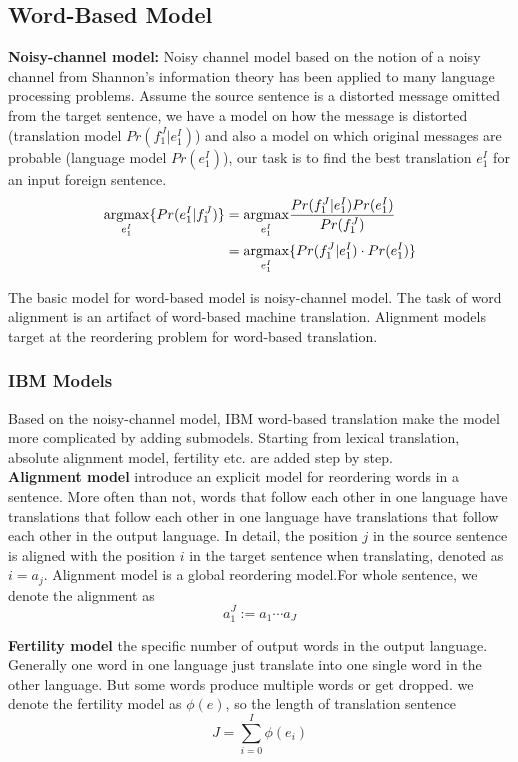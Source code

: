 \subsection{Word-Based Model}
\noindent \textbf{Noisy-channel model:}
Noisy channel model based on the notion of a noisy channel from Shannon's information theory has been applied to many language processing problems. Assume the source sentence is a distorted message omitted from the target sentence, we have a model on  how the message is distorted (translation model $Pr(f_1^J|e_1^I)$) and also a model on which original messages are probable (language model ${Pr(e_1^I)}$), our task is to find the best translation ${e_1^I}$ for an input foreign sentence.
\begin{align*}
\underset{e_1^I}{\operatorname{argmax}} \{Pr(e_1^I | f_1^J)\} & = \underset{e_1^I}{\operatorname{argmax}} {\frac{Pr(f_1^J | e_1^I)Pr(e_1^I)}{Pr(f_1^J)}} \\
& = \underset{e_1^I}{\operatorname{argmax}} { \{ Pr(f_1^J | e_1^I) \cdot  Pr(e_1^I)\} }
\end{align*} 


The basic model for word-based model is noisy-channel model. The task of word alignment is an artifact of word-based machine translation. Alignment models target at the reordering problem for word-based translation.\\

\subsubsection{IBM Models}
Based on the noisy-channel model, IBM word-based translation make the model more complicated by adding submodels. Starting from lexical translation, absolute alignment model, fertility etc. are added step by step.\\

 \textbf{Alignment model} introduce an explicit model for reordering words in a sentence. More often than not, words that follow each other in one language have translations that follow each other in one language have translations that follow each other in the output language. In detail, the position $j$ in the source sentence is aligned with the position $i$ in the target sentence when translating, denoted as  ${i=a_j}$. Alignment model is a global reordering model.For whole sentence, we denote the alignment as 
\[a_1^J:= a_1\cdots a_J\]

\textbf{Fertility model} the specific number of output words in the output language. Generally one word in one language just translate into one single word in the other language. But some words produce multiple words or get dropped. we denote the fertility model as $\phi(e)$, so the length of translation sentence  
\[ J = \sum_{i=0}^{I} \phi(e_i) \]

